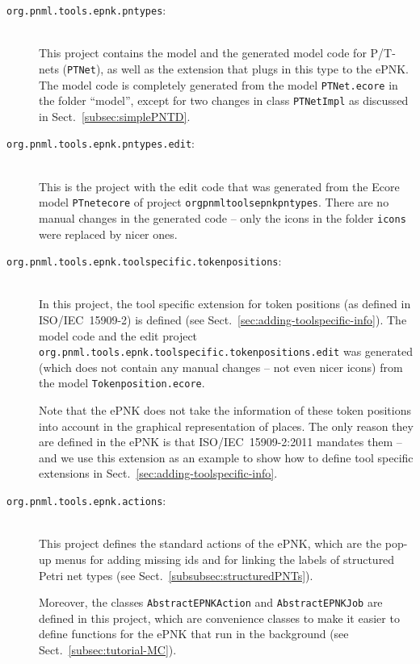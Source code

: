 \begin{description}
  \item[{\tt org.pnml.tools.epnk.pntypes}:] ~\\
    This project contains the model
    and the generated model code for P/T-nets ({\tt PTNet}),%
    as well as the extension that plugs in this type to the ePNK. The model code
    is completely generated from the model {\tt PTNet.ecore} in the folder
    ``model'', except for two changes in class {\tt PTNetImpl} as discussed in
    Sect.~\ref{subsec:simplePNTD}.

  \item[{\tt org.pnml.tools.epnk.pntypes.edit}:] ~\\
    This is the project with the
    edit code that was generated from the Ecore model {\tt PTnet\qnsep{}ecore}
    of project {\tt org\qnsep{}pnml\qnsep{}tools\qnsep{}epnk\qnsep{}pntypes}.
    There are no manual changes in the generated code -- only the icons in the
    folder {\tt icons} were replaced by nicer ones.
    
  \item[{\tt org.pnml.tools.epnk.toolspecific.tokenpositions}:] ~\\
    In this project,
    the tool specific extension for token positions%
    (as defined in ISO/IEC~15909-2) is defined (see
    Sect.~\ref{sec:adding-toolspecific-info}). The model code and the edit
    project {\tt org.pnml.tools.epnk.toolspecific.token\-po\-si\-tions.edit}
    was generated (which does not contain any manual changes -- not even nicer icons) from the model
    {\tt Tokenposition.ecore}.

    Note that the ePNK does not take the information of these token positions
    into account in the graphical representation of places. The only reason they
    are defined in the ePNK is that ISO/IEC~15909-2:2011 mandates them
    -- and we use this extension as an example to show how to define tool specific
    extensions in Sect.~\ref{sec:adding-toolspecific-info}.
    
  \item[{\tt org.pnml.tools.epnk.actions}:] ~\\
    This project defines the
    standard actions of the ePNK, which are the pop-up menus for adding
    missing ids and for linking the labels of structured Petri net types
    (see Sect.~\ref{subsubsec:structuredPNTs}).
    
    Moreover, the classes {\tt AbstractEPNKAction}%
    and {\tt AbstractEPNKJob}%
    are defined in this project, which are convenience classes to make it easier
    to define functions for the ePNK that run in the background (see
    Sect.~\ref{subsec:tutorial-MC}).
    

\end{description}
